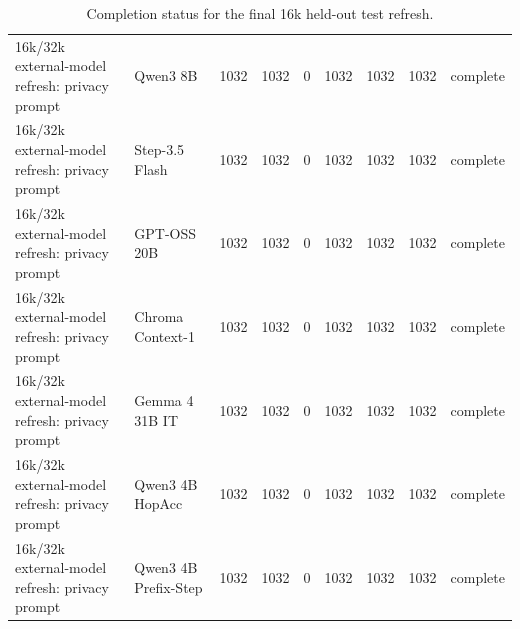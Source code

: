 \begin{table}[t]
\begin{tabular}{lllllllll}
16k/32k external-model refresh: privacy prompt & Qwen3 8B & 1032 & 1032 & 0 & 1032 & 1032 & 1032 & complete \\
16k/32k external-model refresh: privacy prompt & Step-3.5 Flash & 1032 & 1032 & 0 & 1032 & 1032 & 1032 & complete \\
16k/32k external-model refresh: privacy prompt & GPT-OSS 20B & 1032 & 1032 & 0 & 1032 & 1032 & 1032 & complete \\
16k/32k external-model refresh: privacy prompt & Chroma Context-1 & 1032 & 1032 & 0 & 1032 & 1032 & 1032 & complete \\
16k/32k external-model refresh: privacy prompt & Gemma 4 31B IT & 1032 & 1032 & 0 & 1032 & 1032 & 1032 & complete \\
16k/32k external-model refresh: privacy prompt & Qwen3 4B HopAcc & 1032 & 1032 & 0 & 1032 & 1032 & 1032 & complete \\
16k/32k external-model refresh: privacy prompt & Qwen3 4B Prefix-Step & 1032 & 1032 & 0 & 1032 & 1032 & 1032 & complete \\
\bottomrule
\end{tabular}
\caption{Completion status for the final 16k held-out test refresh.}
\label{tab:final_refresh_status}
\end{table}
